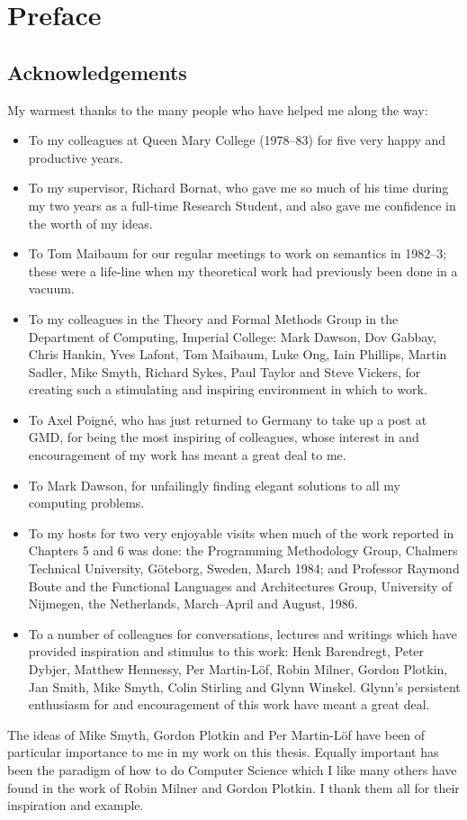 \chapter*{Preface}
\section*{Acknowledgements}
My warmest thanks to the many people who have helped me along the way:
\begin{itemize}
\item To my colleagues at Queen Mary College (1978--83) for five
very happy and productive years.
\item To my supervisor, Richard Bornat, who gave me so much of his
time during my two years as a full-time Research Student, and also
gave me confidence in the worth of my ideas.
\item To Tom Maibaum for our regular meetings to work on semantics
in 1982--3; these were a life-line when my theoretical work had
previously been done in a vacuum.
\item To my colleagues in the Theory and Formal Methods Group
in the Department of Computing, Imperial College: 
Mark Dawson, Dov Gabbay, Chris Hankin, Yves Lafont, Tom Maibaum, Luke Ong, Iain Phillips, 
Martin Sadler, Mike Smyth,  Richard Sykes, 
Paul Taylor and Steve Vickers,
for creating such a stimulating and inspiring environment in which to
work.
\item To Axel Poign\'{e}, who has just returned to Germany to take
up a post at GMD, for being the most inspiring of colleagues,
whose interest in and encouragement of my work has meant
a great deal to me.
\item To Mark Dawson, for unfailingly finding elegant solutions to all
my computing problems.
\item To my hosts for two very enjoyable visits when much of the
work reported in Chapters 5 and 6 was done: the Programming
Methodology Group, Chalmers Technical University, G\"{o}teborg, Sweden,
March 1984; and Professor Raymond Boute and the Functional Languages 
and Architectures Group, University of Nijmegen, the Netherlands, 
March--April and
August, 1986.
\item To a number of colleagues for conversations, lectures and writings
which have provided inspiration and stimulus to this work: Henk Barendregt,
Peter Dybjer, Matthew Hennessy,  Per Martin-L\"{o}f, 
Robin Milner, 
Gordon Plotkin, Jan Smith, 
Mike Smyth,
Colin Stirling
and  Glynn Winskel.
Glynn's persistent enthusiasm for and encouragement of this work have
meant a great deal.
\end{itemize}
The ideas of  Mike Smyth, Gordon Plotkin and Per Martin-L\"{o}f have
been of particular importance to me in my work on this thesis.
Equally important has been the paradigm of how to do Computer Science
which I like many others have found in the work of Robin Milner and 
Gordon  Plotkin.
I thank them all for their inspiration and example.

